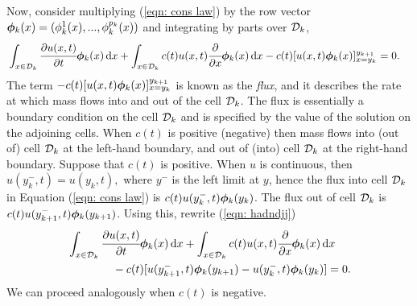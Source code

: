 Now, consider multiplying (\ref{eqn: cons law}) by the row vector \(\boldsymbol \phi_k(x)=(\phi_k^1(x),...,\phi_k^{p_k}(x))\) and integrating by parts over \(\mathcal{D}_k\),
\begin{align}
	&\int_{x\in \mathcal{D}_k}\cfrac{\partial u(x,t)}{\partial t}\boldsymbol\phi_k(x)\, \mathrm{d} x + \int_{x\in \mathcal{D}_k} c(t) u(x,t)\cfrac{\partial}{\partial x} \boldsymbol \phi_k( x)\, \mathrm{d} x - c(t)[u(x,t)\boldsymbol \phi_k(x)]_{x=y_k}^{y_{k+1}} = 0.\label{eqn: hadndjj}
\end{align}
The term \(- c(t)[u(x,t)\boldsymbol \phi_k(x)]_{x=y_k}^{y_{k+1}}\) is known as the \emph{flux}, and it describes the rate at which mass flows into and out of the cell \(\mathcal{D}_k\). The flux is essentially a boundary condition on the cell \(\mathcal{D}_k\) and is specified by the value of the solution on the adjoining cells. When \(c(t)\) is positive (negative) then mass flows into (out of) cell \(\mathcal{D}_k\) at the left-hand boundary, and out of (into) cell \(\mathcal{D}_k\) at the right-hand boundary. Suppose that \(c(t)\) is positive. When \(u\) is continuous, then \(u(y_{k}^-,t)=u(y_k,t),\) where \(y^-\) is the left limit at \(y\), hence the flux into cell \(\mathcal{D}_k\) in Equation (\ref{eqn: cons law}) is \(c(t)u(y_k^-,t)\boldsymbol \phi_k(y_k)\). The flux out of cell \(\mathcal{D}_k\) is \(c(t)u(y_{k+1}^-,t)\boldsymbol \phi_k(y_{k+1})\). Using this, rewrite (\ref{eqn: hadndjj})
\begin{align}
	&\int_{x\in \mathcal{D}_k}\cfrac{\partial u(x,t)}{\partial t}\boldsymbol\phi_k(x)\, \mathrm{d} x + \int_{x\in \mathcal{D}_k} c(t) u(x,t)\cfrac{\partial}{\partial x} \boldsymbol \phi_k( x)\, \mathrm{d} x \nonumber
	\\&\qquad\qquad{}- c(t)[u(y_{k+1}^-,t)\boldsymbol \phi_k(y_{k+1}) - u(y_{k}^-,t)\boldsymbol \phi_k(y_{k})] = 0.\label{eqn: hadndjjj}
\end{align}
We can proceed analogously when \(c(t)\) is negative. 

